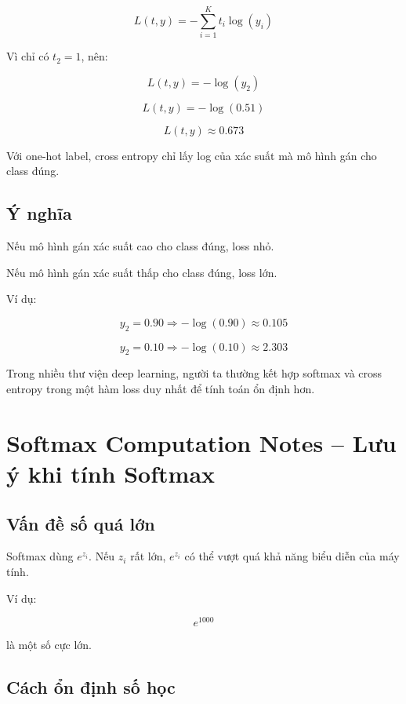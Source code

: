 \[
    L(t,y)
    =
    -\sum_{i=1}^{K} t_i\log(y_i)
\]

Vì chỉ có $t_2=1$, nên:

\[
    L(t,y)=-\log(y_2)
\]

\[
    L(t,y)=-\log(0.51)
\]

\[
    L(t,y)\approx 0.673
\]

\begin{ghinho}
Với one-hot label, cross entropy chỉ lấy log của xác suất mà mô hình gán cho class đúng.
\end{ghinho}

\subsection{Ý nghĩa}

Nếu mô hình gán xác suất cao cho class đúng, loss nhỏ.

Nếu mô hình gán xác suất thấp cho class đúng, loss lớn.

Ví dụ:

\[
    y_2=0.90
    \Rightarrow
    -\log(0.90)\approx 0.105
\]

\[
    y_2=0.10
    \Rightarrow
    -\log(0.10)\approx 2.303
\]

\begin{luuy}
Trong nhiều thư viện deep learning, người ta thường kết hợp softmax và cross entropy trong một hàm loss duy nhất để tính toán ổn định hơn.
\end{luuy}

\section{Softmax Computation Notes -- Lưu ý khi tính Softmax}

\subsection{Vấn đề số quá lớn}

Softmax dùng $e^{z_i}$. Nếu $z_i$ rất lớn, $e^{z_i}$ có thể vượt quá khả năng biểu diễn của máy tính.

Ví dụ:

\[
    e^{1000}
\]

là một số cực lớn.

\subsection{Cách ổn định số học}

